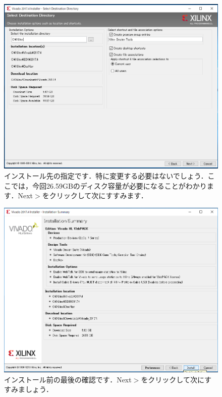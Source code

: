 \documentclass[a4paper,dvipdfmx]{jsarticle}
\begin{document}
 \begin{figure}[H]
  \begin{center}
   \includegraphics[width=.8\textwidth]{appendix_figures/13_installer_main.png}
  \end{center}
  \caption{インストール先の指定です．特に変更する必要はないでしょう．ここでは，今回26.59GBのディスク容量が必要になることがわかります．Next$\gt$をクリックして次にすすみます．}
 \end{figure}

 \begin{figure}[H]
  \begin{center}
   \includegraphics[width=.8\textwidth]{appendix_figures/14_installer_main.png}
  \end{center}
  \caption{インストール前の最後の確認です．Next$\gt$をクリックして次にすすみましょう．}
 \end{figure}
\end{document}
